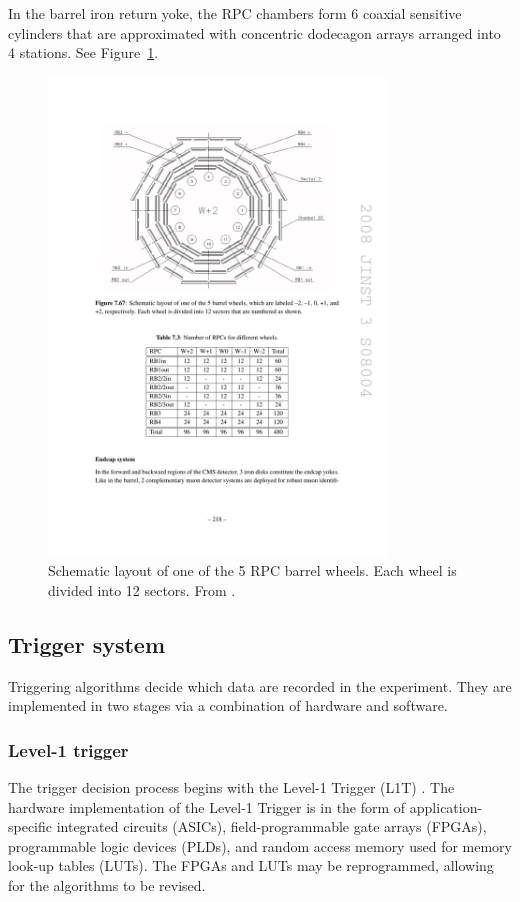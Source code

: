 In the barrel iron return yoke, the RPC chambers form 6 coaxial sensitive cylinders
that are approximated with concentric dodecagon arrays arranged into 4 stations. See Figure~\ref{fig:cms_rpc_barrel}.

\begin{figure}[hbtp]
\centering
\includegraphics[width=0.8\textwidth]{figures/cms_rpc_barrel.pdf}
\caption{
Schematic layout of one of the 5 RPC barrel wheels. Each wheel is divided into 12 sectors.
From \cite{Chatrchyan:2008aa}.
}
\label{fig:cms_rpc_barrel}
\end{figure}
\clearpage

\subsection{Trigger system}
Triggering algorithms decide which data are recorded in the experiment.
They are implemented in two stages via a combination of hardware and software.

\subsubsection{Level-1 trigger}
The trigger decision process begins with the Level-1 Trigger (L1T) \cite{Khachatryan:2016bia}.  
The hardware implementation of the Level-1 Trigger is in the form of application-specific
integrated circuits (ASICs), field-programmable gate arrays (FPGAs), 
programmable logic devices (PLDs), and random access memory used for memory look-up tables (LUTs).
The FPGAs and LUTs may be reprogrammed, allowing for the algorithms to be revised.

